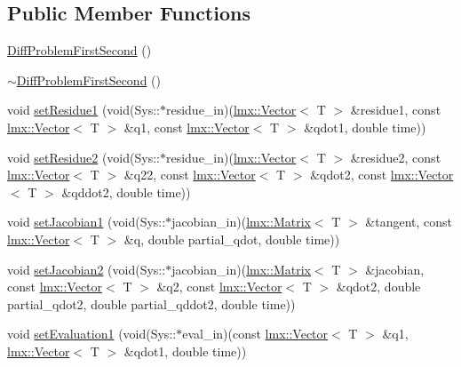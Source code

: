 \subsection*{Public Member Functions}
\begin{DoxyCompactItemize}
\item 
\hyperlink{classlmx_1_1DiffProblemFirstSecond_a9e2f759e3e107813649da898de93d77e}{Diff\-Problem\-First\-Second} ()
\item 
\hyperlink{classlmx_1_1DiffProblemFirstSecond_a1cab6a5d53274ee536f2f7860314c639}{$\sim$\-Diff\-Problem\-First\-Second} ()
\item 
void \hyperlink{classlmx_1_1DiffProblemFirstSecond_a3a0b8b68ca8734186818dd00f85c8083}{set\-Residue1} (void(Sys\-::$\ast$residue\-\_\-in)(\hyperlink{classlmx_1_1Vector}{lmx\-::\-Vector}$<$ T $>$ \&residue1, const \hyperlink{classlmx_1_1Vector}{lmx\-::\-Vector}$<$ T $>$ \&q1, const \hyperlink{classlmx_1_1Vector}{lmx\-::\-Vector}$<$ T $>$ \&qdot1, double time))
\item 
void \hyperlink{classlmx_1_1DiffProblemFirstSecond_a3e81937bfa43925116a5e188836d0e8f}{set\-Residue2} (void(Sys\-::$\ast$residue\-\_\-in)(\hyperlink{classlmx_1_1Vector}{lmx\-::\-Vector}$<$ T $>$ \&residue2, const \hyperlink{classlmx_1_1Vector}{lmx\-::\-Vector}$<$ T $>$ \&q22, const \hyperlink{classlmx_1_1Vector}{lmx\-::\-Vector}$<$ T $>$ \&qdot2, const \hyperlink{classlmx_1_1Vector}{lmx\-::\-Vector}$<$ T $>$ \&qddot2, double time))
\item 
void \hyperlink{classlmx_1_1DiffProblemFirstSecond_af205d6b2c2f373f52b578d4df294bbf4}{set\-Jacobian1} (void(Sys\-::$\ast$jacobian\-\_\-in)(\hyperlink{classlmx_1_1Matrix}{lmx\-::\-Matrix}$<$ T $>$ \&tangent, const \hyperlink{classlmx_1_1Vector}{lmx\-::\-Vector}$<$ T $>$ \&q, double partial\-\_\-qdot, double time))
\item 
void \hyperlink{classlmx_1_1DiffProblemFirstSecond_a16cdf1d52158265f661f81ff36d64362}{set\-Jacobian2} (void(Sys\-::$\ast$jacobian\-\_\-in)(\hyperlink{classlmx_1_1Matrix}{lmx\-::\-Matrix}$<$ T $>$ \&jacobian, const \hyperlink{classlmx_1_1Vector}{lmx\-::\-Vector}$<$ T $>$ \&q2, const \hyperlink{classlmx_1_1Vector}{lmx\-::\-Vector}$<$ T $>$ \&qdot2, double partial\-\_\-qdot2, double partial\-\_\-qddot2, double time))
\item 
void \hyperlink{classlmx_1_1DiffProblemFirstSecond_a71526f8aa1540bbefd55645fb46cc1bf}{set\-Evaluation1} (void(Sys\-::$\ast$eval\-\_\-in)(const \hyperlink{classlmx_1_1Vector}{lmx\-::\-Vector}$<$ T $>$ \&q1, \hyperlink{classlmx_1_1Vector}{lmx\-::\-Vector}$<$ T $>$ \&qdot1, double time))

\end{DoxyCompactItemize}
